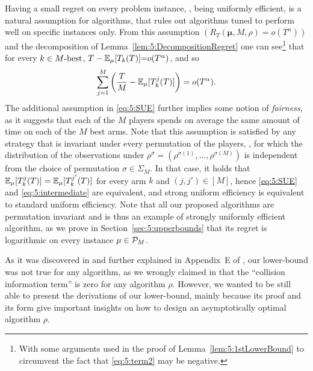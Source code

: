 Having a small regret on every problem instance, \ie, being uniformly efficient,
is a natural assumption for algorithms,
that rules out algorithms tuned to perform well on specific instances only.
%
From this assumption $\left(R_T(\boldsymbol{\mu},M,\rho)=o(T^\alpha)\right)$ and the decomposition of Lemma~\ref{lem:5:DecompositionRegret} one can see\footnote{With some arguments used in the proof of Lemma~\ref{lem:5:1stLowerBound} to circumvent the fact that \ref{eq:5:term2} may be negative.} that for every $k \in M\text{-}\mathrm{best}$,
${T}- \mathbb{E}_{\mu}[T_k(T)] {=} o(T^{\alpha})$, and so
\begin{equation}\label{eq:5:intermediate}
  \sum_{j =1}^M\left(\frac{T}{M} - \mathbb{E}_{\mu}[T^j_k(T)]\right) = o(T^{\alpha}).
\end{equation}
The additional assumption in \eqref{eq:5:SUE} further implies some notion of \emph{fairness}, as it suggests that each of the $M$ players spends on average the same amount of time on each of the $M$ best arms. Note that this assumption is satisfied by any strategy that is invariant under every permutation of the players, \ie, for which the distribution of the observations under $\rho^{\sigma} = (\rho^{\sigma(1)},\dots,\rho^{\sigma(M)})$ is independent from the choice of permutation $\sigma \in \Sigma_M$. In that case, it holds that  $\mathbb{E}_{\mu}[T_k^j(T)]=\mathbb{E}_{\mu}[T_k^{j'}(T)]$ for every arm $k$ and $(j,j') \in [M]$, hence \eqref{eq:5:SUE} and \eqref{eq:5:intermediate} are equivalent, and strong uniform efficiency is equivalent to standard uniform efficiency. Note that all our proposed algorithms are permutation invariant and \MCTopM{} is thus an example of strongly uniformly efficient algorithm, as we prove in Section~\ref{sec:5:upperbounds} that its regret is logarithmic on every instance $\mu \in \mathcal{P}_M$.

As it was discovered in \cite{BoursierPerchet18} and further explained in Appendix~E of \cite{KaufmannAbbas19}, our lower-bound was not true for any algorithm, as we wrongly claimed in \cite{Besson2018ALT} that the ``collision information term'' is zero for any algorithm $\rho$.
However, we wanted to be still able to present the derivations of our lower-bound, mainly because its proof and its form give important insights on how to design an asymptotically optimal algorithm $\rho$.

